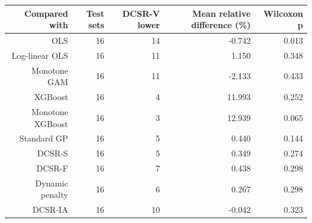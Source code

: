 \begin{tabular}{rrrrr}
\hline
Compared with & Test sets & DCSR-V lower & Mean relative difference (\%) & Wilcoxon p \\
\hline
OLS & 16 & 14 & -0.742 & 0.013 \\
Log-linear OLS & 16 & 11 & 1.150 & 0.348 \\
Monotone GAM & 16 & 11 & -2.133 & 0.433 \\
XGBoost & 16 & 4 & 11.993 & 0.252 \\
Monotone XGBoost & 16 & 3 & 12.939 & 0.065 \\
Standard GP & 16 & 5 & 0.440 & 0.144 \\
DCSR-S & 16 & 5 & 0.349 & 0.274 \\
DCSR-F & 16 & 7 & 0.438 & 0.298 \\
Dynamic penalty & 16 & 6 & 0.267 & 0.298 \\
DCSR-IA & 16 & 10 & -0.042 & 0.323 \\
\hline
\end{tabular}
